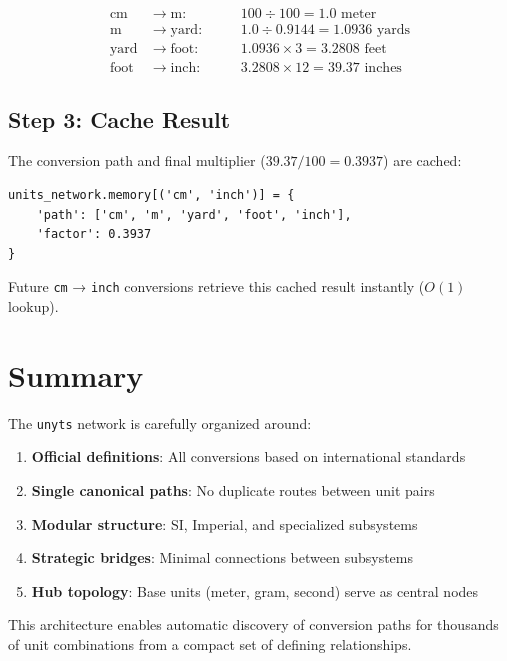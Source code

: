 \documentclass[11pt,a4paper]{report}
\begin{document}
\begin{align*}
\text{cm} &\rightarrow \text{m}: \quad && 100 \div 100 = 1.0 \text{ meter} \\
\text{m} &\rightarrow \text{yard}: \quad && 1.0 \div 0.9144 = 1.0936 \text{ yards} \\
\text{yard} &\rightarrow \text{foot}: \quad && 1.0936 \times 3 = 3.2808 \text{ feet} \\
\text{foot} &\rightarrow \text{inch}: \quad && 3.2808 \times 12 = 39.37 \text{ inches}
\end{align*}

\subsection{Step 3: Cache Result}

The conversion path and final multiplier ($39.37 / 100 = 0.3937$) are cached:
\begin{lstlisting}[style=pythonstyle]
units_network.memory[('cm', 'inch')] = {
    'path': ['cm', 'm', 'yard', 'foot', 'inch'],
    'factor': 0.3937
}
\end{lstlisting}

Future \texttt{cm} → \texttt{inch} conversions retrieve this cached result instantly ($O(1)$ lookup).

\section{Summary}

The \texttt{unyts} network is carefully organized around:
\begin{enumerate}[leftmargin=*]
  \item \textbf{Official definitions}: All conversions based on international standards
  \item \textbf{Single canonical paths}: No duplicate routes between unit pairs
  \item \textbf{Modular structure}: SI, Imperial, and specialized subsystems
  \item \textbf{Strategic bridges}: Minimal connections between subsystems
  \item \textbf{Hub topology}: Base units (meter, gram, second) serve as central nodes
\end{enumerate}

This architecture enables automatic discovery of conversion paths for thousands of unit combinations from a compact set of defining relationships.


\end{document}
